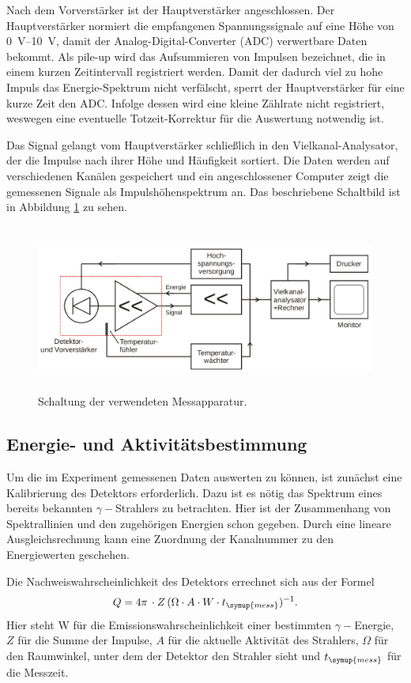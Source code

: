 Nach dem Vorverstärker ist der Hauptverstärker angeschlossen.
Der Hauptverstärker normiert die empfangenen Spannungssignale auf eine Höhe von \SIrange{0}{10}{\volt}, damit der Analog-Digital-Converter (ADC) verwertbare Daten bekommt.
Als pile-up wird das Aufsummieren von Impulsen bezeichnet, die in einem kurzen Zeitintervall registriert werden.
Damit der dadurch viel zu hohe Impuls das Energie-Spektrum nicht verfälscht, sperrt der Hauptverstärker für eine kurze Zeit den ADC.
Infolge dessen wird eine kleine Zählrate nicht registriert, weswegen eine eventuelle Totzeit-Korrektur für die Auswertung notwendig ist.

Das Signal gelangt vom Hauptverstärker schließlich in den Vielkanal-Analysator, der die Impulse nach ihrer Höhe und Häufigkeit sortiert.
Die Daten werden auf verschiedenen Kanälen gespeichert und ein angeschlossener Computer zeigt die gemessenen Signale als Impulshöhenspektrum an.
Das beschriebene Schaltbild ist in Abbildung \ref{fig:Schaltung} zu sehen.
 \begin{figure}
   \centering
   \includegraphics[height=5.5cm]{content/pictures/Schaltung.png}
   \caption{Schaltung der verwendeten Messapparatur.\cite{V18}}
   \label{fig:Schaltung}
 \end{figure}
\subsection{Energie- und Aktivitätsbestimmung}
Um die im Experiment gemessenen Daten auswerten zu können, ist zunächst eine Kalibrierung des Detektors erforderlich.
Dazu ist es nötig das Spektrum eines bereits bekannten $\gamma-$Strahlers zu betrachten.
Hier ist der Zusammenhang von Spektrallinien und den zugehörigen Energien schon gegeben.
Durch eine lineare Ausgleichsrechnung kann eine Zuordnung der Kanalnummer zu den Energiewerten geschehen.

Die Nachweiswahrscheinlichkeit des Detektors errechnet sich aus der Formel
\begin{equation}
\label{eqn:eff} 
Q = 4\pi\,\cdot Z\,(\Omega\cdot A\cdot W\cdot t_{\symup{mess}})^{-1}.
\end{equation}
Hier steht W für die Emissionswahrscheinlichkeit einer bestimmten $\gamma-$Energie, $Z$ für die Summe der Impulse, $A$ für die aktuelle Aktivität des Strahlers, $\Omega$ für den Raumwinkel, unter dem der Detektor den Strahler sieht und $t_{\symup{mess}}$ für die Messzeit.

